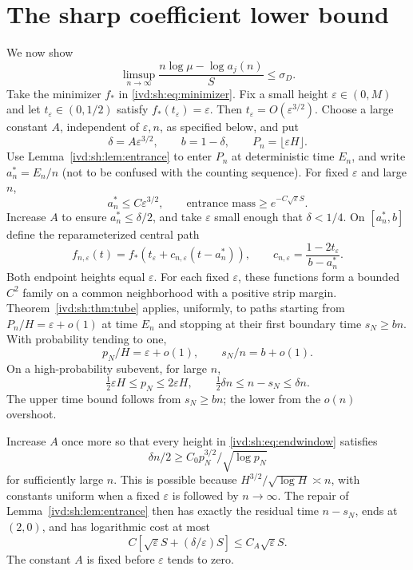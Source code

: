 \documentclass[11pt,letterpaper]{article}
\theoremstyle{remark}\newtheorem{remark}[theorem]{Remark}
\numberwithin{equation}{section}
\begin{document}
\section{The sharp coefficient lower bound}\label{ivd:sh:sec:lower}
We now show
\begin{equation}\label{ivd:sh:eq:lowergoal}
 \limsup_{n\to\infty}\frac{n\log\mu-\log a_j(n)}S\le\sigma_D.
\end{equation}
Take the minimizer $f_*$ in \eqref{ivd:sh:eq:minimizer}. Fix a small
height $\varepsilon\in(0,M)$ and let $t_\varepsilon\in(0,1/2)$
satisfy $f_*(t_\varepsilon)=\varepsilon$.
Then $t_\varepsilon=O(\varepsilon^{3/2})$.
Choose a large constant $A$, independent of $\varepsilon,n$, as
specified below, and put
\[
 \delta=A\varepsilon^{3/2},\qquad b=1-\delta,\qquad
 P_n=\lfloor\varepsilon H\rfloor.
\]
Use Lemma~\ref{ivd:sh:lem:entrance} to enter $P_n$ at deterministic time
$E_n$, and write $a_n^*=E_n/n$ (not to be confused with the counting
sequence). For fixed $\varepsilon$ and large $n$,
\begin{equation}\label{ivd:sh:eq:entrancescale}
 a_n^*\le C\varepsilon^{3/2},\qquad
 \text{entrance mass}\ge e^{-C\sqrt\varepsilon S}.
\end{equation}
Increase $A$ to ensure $a_n^*\le\delta/2$, and take
$\varepsilon$ small enough that $\delta<1/4$.
On $[a_n^*,b]$ define the reparameterized central path
\begin{equation}\label{ivd:sh:eq:centralpath}
 f_{n,\varepsilon}(t)
   =f_*(t_\varepsilon+c_{n,\varepsilon}(t-a_n^*)),\qquad
 c_{n,\varepsilon}=\frac{1-2t_\varepsilon}{b-a_n^*}.
\end{equation}
Both endpoint heights equal $\varepsilon$.
For each fixed $\varepsilon$, these functions form a bounded $C^2$
family on a common neighborhood with a positive strip margin.
Theorem~\ref{ivd:sh:thm:tube} applies, uniformly, to paths starting from
$P_n/H=\varepsilon+o(1)$ at time $E_n$ and stopping at their first
boundary time $s_N\ge bn$. With probability tending to one,
\[
 p_N/H=\varepsilon+o(1),\qquad s_N/n=b+o(1).
\]
On a high-probability subevent, for large $n$,
\begin{equation}\label{ivd:sh:eq:endwindow}
 \tfrac12\varepsilon H\le p_N\le2\varepsilon H,\qquad
 \tfrac12\delta n\le n-s_N\le\delta n.
\end{equation}
The upper time bound follows from $s_N\ge bn$; the lower from the
$o(n)$ overshoot.

Increase $A$ once more so that every height in
\eqref{ivd:sh:eq:endwindow} satisfies
\[
 \delta n/2\ge C_0p_N^{3/2}/\sqrt{\log p_N}
\]
for sufficiently large $n$. This is possible because
$H^{3/2}/\sqrt{\log H}\asymp n$, with constants uniform when a
fixed $\varepsilon$ is followed by $n\to\infty$.
The repair of Lemma~\ref{ivd:sh:lem:entrance} then has exactly the residual
time $n-s_N$, ends at $(2,0)$, and has logarithmic cost at most
\begin{equation}\label{ivd:sh:eq:repairscale}
 C[\sqrt\varepsilon S+(\delta/\varepsilon)S]
 \le C_A\sqrt\varepsilon S.
\end{equation}
The constant $A$ is fixed before $\varepsilon$ tends to zero.
\end{document}
